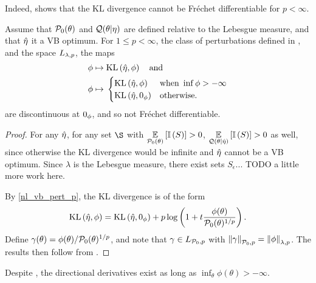 Indeed,  shows that the KL divergence
cannot be Fr{\'e}chet differentiable for $p < \infty$.

%
\begin{cor}
%
Assume that $\mathcal{P}_{0}(\theta)$ and $\mathcal{Q}(\theta \vert \eta)$ are defined relative to
the Lebesgue measure, and that $\hat\eta$ it a VB optimum.  For $1 \le p <
\infty$, the class of perturbations defined in , and the
space ${L_{\lambda, p}}$, the maps
%
\begin{align*}
%
\phi \mapsto{}& \KL{\etaopt, \phi} \mathand \\
\phi \mapsto{}&
\begin{cases}
    \KL{\etaopt, \phi} & \textrm{when }\inf \phi > -\infty \\
    \KL{\etaopt, \phiz} & \textrm{otherwise}.
\end{cases}
%
\end{align*}
%
are discontinuous at $0_\phi$, and so not Fr{\'e}chet differentiable.
%
\begin{proof}
%
For any $\hat\eta$, for any set $\S$ with $\underset{\mathcal{P}_{0}(\theta)}{\mathbb{E}}\left[\mathbb{I}\left(S\right)\right] > 0$,
$\underset{\mathcal{Q}(\theta \vert \hat\eta)}{\mathbb{E}}\left[\mathbb{I}\left(S\right)\right] > 0$ as well, since otherwise
the KL divergence would be infinite and $\hat\eta$ cannot be a VB optimum.
Since $\lambda$ is the Lebesgue measure, there exist sets $S_\epsilon$...
TODO a little more work here.

By \eqref{nl_vb_pert_p}, the KL divergence is of the form
%
\begin{align*}
%
\KL{\etaopt, \phi} = \KL{\etaopt, \phiz} +
    p \log\left(1 + \t \frac{\phi(\theta)}{\pbase(\theta)^{1/p}}\right).
%
\end{align*}
%
Define $\gamma(\theta) = \phi(\theta) / \mathcal{P}_{0}(\theta)^{1/p}$, and note that
$\gamma \in {L_{\mathcal{P}_{0}, p}}$ with $\left\Vert\gamma\right\Vert_{\mathcal{P}_{0}, p} =
\left\Vert\phi\right\Vert_{\lambda, p}$.  The results then follow from
.
%
\end{proof}
%
\end{cor}


Despite , the directional derivatives exist
as long as $\inf_\theta \phi(\theta) > -\infty$.


